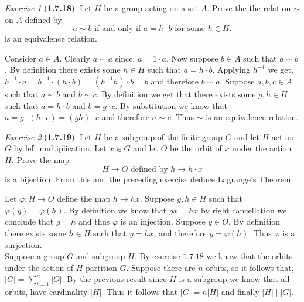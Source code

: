 \documentclass[12pt]{amsart}
\makeatletter
\theoremstyle{remark}
\newtheorem*{exercise}{Exercise}%
\renewenvironment{proof}[1][\proofname]{\par\doublespacing
  \pushQED{\qed}%
  \normalfont \topsep6\p@\@plus6\p@\relax
  \list{}{%
    \settowidth{\leftmargin}{\itshape\proofname:\hskip\labelsep}%
    \setlength{\labelwidth}{0pt}%
    \setlength{\itemindent}{-\leftmargin}%
  }%
  \item[\hskip\labelsep\itshape#1\@addpunct{:}]\ignorespaces
}{%
  \popQED\endlist\@endpefalse
  \singlespacing
}
\theoremstyle{mycomment}
\makeatother
\begin{document}
\begin{exercise}[\textbf{1.7.18}] Let $H$ be a group acting on a set $A$. Prove the the relation $\sim$ on $A$ defined by 
  \begin{equation*}
    a \sim b \text{ if and only if } a = h \cdot b \text{ for some $h \in H$}.
  \end{equation*}
  is an equivalence relation. 
  \begin{proof} Consider $a \in A$. Clearly $a \sim a$ since, $a = 1\cdot a$. Now suppose $b \in A$ such that $a \sim b$. By definition there exists some 
    $h \in H$ such that $a = h\cdot b$. Applying $h^{-1}$ we get, $ h^{-1}\cdot a = h^{-1}\cdot(h\cdot b) = (h^{-1}h)\cdot b = b$ and therefore $b \sim a$. 
    Suppose $a, b, c \in A$ such that $a \sim b$ and $b \sim c$. By definition we get that there exists some $g, h \in H$ such that $a = h \cdot b$ and $b = g \cdot c$. 
    By substitution we know that $a = g \cdot(h \cdot c) = (gh) \cdot c$ and therefore $a \sim c$. Thus $\sim$ is an equivalence relation.  
  \end{proof}
\end{exercise}
\vspace{.15in}


\begin{exercise}[\textbf{1.7.19}] Let $H$ be a subgroup of the finite group $G$ and let $H$ act on $G$ by left multiplication. 
  Let $x \in G$ and let $O$ be the orbit of $x$ under the action $H$. Prove the map 
  \begin{equation*}
    H \to O \text{ defined by } h \to h\cdot x
  \end{equation*}
  is a bijection. From this and the preceding exercise deduce Lagrange's Theorem. 
  \begin{proof} Let $\varphi: H \to O$ define the map $h \to hx$. Suppose $g, h \in H$ such that $\varphi(g) = \varphi(h)$.
    By definition we know that $gx = hx$ by right cancellation we conclude that $g = h$ and thus $\varphi$ is an injection. 
    Suppose $y \in O$. By definition there exists some $h \in H$ such that $y = hx$, and therefore $y = \varphi(h)$. Thus $\varphi$ is a surjection.\\

    Suppose a group $G$ and subgroup $H$. By exercise $1.7.18$ we know that the orbits under the action of $H$ partition $G$. Suppose there are $n$ orbits, so 
    it follows that, $|G| = \sum_{i = 1}^n |O|$. By the previous result since $H$ is a subgroup we know that all orbits, have cardinality $|H|$. Thus it follows that $|G| = n|H|$ and finally 
    $|H|\mid |G|$. 
    \end{proof}
\end{exercise}
\vspace{.15in}
\end{document}

